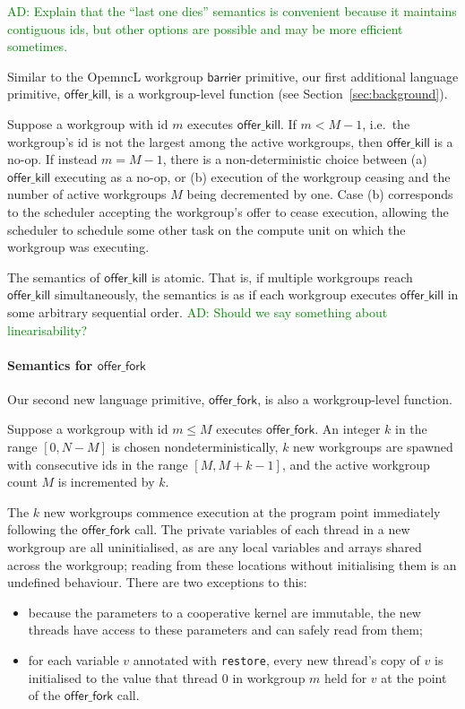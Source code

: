 \documentclass[nocopyrightspace]{sigplanconf-pldi16}
\newcommand{\ADComment}[1]{\textcolor{green}{AD: #1}}
\newcommand{\restore}{\texttt{restore}}
\newcommand{\offerfork}{\mathsf{offer\_fork}}
\newcommand{\offerkill}{\mathsf{offer\_kill}}
\begin{document}
\ADComment{Explain that the ``last one dies'' semantics is convenient because it maintains contiguous ids, but other options are possible and may be more efficient sometimes.}

Similar to the OpemncL workgroup $\mathsf{barrier}$ primitive, our first additional language primitive, $\offerkill$, is a
workgroup-level function (see Section~\ref{sec:background}).

Suppose a workgroup with id $m$ executes $\offerkill$.  If $m < M-1$,
i.e.\ the workgroup's id is not the largest among the active
workgroups, then $\offerkill$ is a no-op.  If instead $m = M-1$, there
is a non-deterministic choice between (a) $\offerkill$ executing as a
no-op, or (b) execution of the workgroup ceasing and the number of
active workgroups $M$ being decremented by one.  Case (b) corresponds
to the scheduler accepting the workgroup's offer to cease execution,
allowing the scheduler to schedule some other task on the compute unit
on which the workgroup was executing.

The semantics of $\offerkill$ is atomic.  That is, if multiple
workgroups reach $\offerkill$ simultaneously, the semantics is as if
each workgroup executes $\offerkill$ in some arbitrary sequential
order.  \ADComment{Should we say something about linearisability?}

\paragraph{Semantics for $\offerfork$}

Our second new language primitive, $\offerfork$, is also a workgroup-level
function.

Suppose a workgroup with id $m\leq M$ executes $\offerfork$.  An
integer $k$ in the range $[0, N-M]$ is chosen nondeterministically,
$k$ new workgroups are spawned with consecutive ids in the range
$[M, M+k-1]$, and the active workgroup count $M$ is incremented by
$k$.

The $k$ new workgroups commence execution at the program point
immediately following the $\offerfork$ call.  The private variables of
each thread in a new workgroup are all uninitialised, as are any local
variables and arrays shared across the workgroup; reading from these
locations without initialising them is an undefined behaviour.  There
are two exceptions to this:

\begin{itemize}

\item because the parameters to a cooperative kernel are immutable,
  the new threads have access to these parameters and can safely read
  from them;

\item for each variable $v$ annotated with \restore, every new
  thread's copy of $v$ is initialised to the value that thread 0 in
  workgroup $m$ held for $v$ at the point of the $\offerfork$ call.

\end{itemize}
\end{document}

